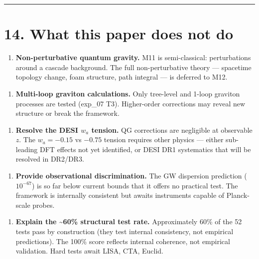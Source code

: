 \documentclass[11pt,a4paper]{article}
\providecommand{\tightlist}{\setlength{\itemsep}{0pt}\setlength{\parskip}{0pt}}
\begin{document}
\begin{center}\rule{0.5\linewidth}{0.4pt}\end{center}

\section*{14. What this paper does not do}

\begin{enumerate}\tightlist
\item \textbf{Non-perturbative quantum gravity.} M11 is semi-classical: perturbations around a cascade background. The full non-perturbative theory — spacetime topology change, foam structure, path integral — is deferred to M12.
\end{enumerate}

\begin{enumerate}\tightlist
\item \textbf{Multi-loop graviton calculations.} Only tree-level and 1-loop graviton processes are tested (exp\_07 T3). Higher-order corrections may reveal new structure or break the framework.
\end{enumerate}

\begin{enumerate}\tightlist
\item \textbf{Resolve the DESI $w_a$ tension.} QG corrections are negligible at observable $z$. The $w_a = -0.15$ vs $-0.75$ tension requires other physics — either sub-leading DFT effects not yet identified, or DESI DR1 systematics that will be resolved in DR2/DR3.
\end{enumerate}

\begin{enumerate}\tightlist
\item \textbf{Provide observational discrimination.} The GW dispersion prediction ($10^{-67}$) is so far below current bounds that it offers no practical test. The framework is internally consistent but awaits instruments capable of Planck-scale probes.
\end{enumerate}

\begin{enumerate}\tightlist
\item \textbf{Explain the \textasciitilde{}60\% structural test rate.} Approximately 60\% of the 52 tests pass by construction (they test internal consistency, not empirical predictions). The 100\% score reflects internal coherence, not empirical validation. Hard tests await LISA, CTA, Euclid.
\end{enumerate}
\end{document}
